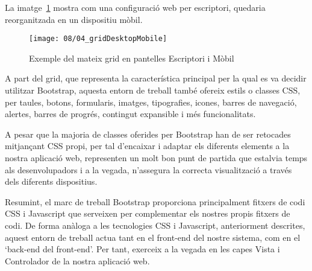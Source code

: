     La imatge~\ref{img:gridAdapted} mostra com una configuració web per escriptori, quedaria re\-or\-ga\-nit\-za\-da en un dispositiu mòbil.

    \begin{figure}[h]
        \texttt{[image: 08/04\_gridDesktopMobile]}
        \centering
        \caption{Exemple del mateix grid en pantelles Escriptori i Mòbil}\label{img:gridAdapted}
    \end{figure}

    A part del grid, que representa la característica principal per la qual es va decidir utilitzar Bootstrap, aquesta entorn de treball també ofereix estils o classes CSS, per taules, botons, formularis, imatges, tipografies, icones, barres de navegació, alertes, barres de progrés, contingut expansible i més funcionalitats.

    A pesar que la majoria de classes oferides per Bootstrap han de ser retocades mitjançant CSS propi, per tal d'encaixar i adaptar els diferents elements a la nostra aplicació web, representen un molt bon punt de partida que estalvia temps als desenvolupadors i a la vegada, n'assegura la correcta visualització a través dels diferents dispositius.

    Resumint, el marc de treball Bootstrap proporciona principalment fitxers de codi CSS i Javascript que serveixen per complementar els nostres propis fitxers de codi. De forma anàloga a les tecnologies CSS i Javascript, anteriorment descrites, aquest entorn de treball actua tant en el front-end del nostre sistema, com en el `back-end del front-end’. Per tant, exerceix a la vegada en les capes Vista i Controlador de la nostra aplicació web.
